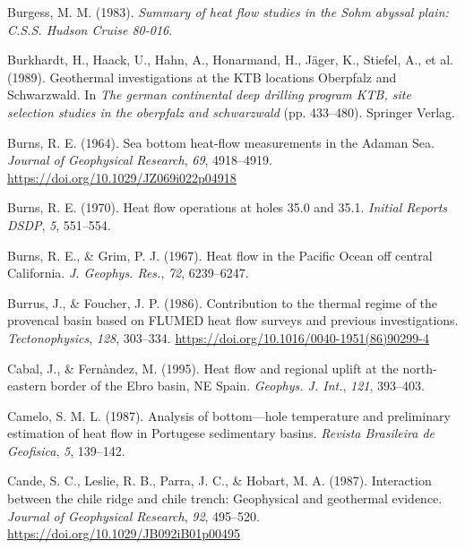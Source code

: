 \begin{CSLReferences}{1}{1}
\leavevmode{}%
Burgess, M. M. (1983). \emph{Summary of heat flow studies in the {Sohm} abyssal plain: {C.S.S. Hudson Cruise} 80-016}.

\leavevmode{}%
Burkhardt, H., Haack, U., Hahn, A., Honarmand, H., Jäger, K., Stiefel, A., et al. (1989). Geothermal investigations at the {KTB locations Oberpfalz and Schwarzwald}. In \emph{The german continental deep drilling program KTB, site selection studies in the oberpfalz and schwarzwald} (pp. 433--480). Springer Verlag.

\leavevmode{}%
Burns, R. E. (1964). Sea bottom heat-flow measurements in the {Adaman Sea}. \emph{Journal of Geophysical Research}, \emph{69}, 4918--4919. \url{https://doi.org/10.1029/JZ069i022p04918}

\leavevmode{}%
Burns, R. E. (1970). Heat flow operations at holes 35.0 and 35.1. \emph{Initial Reports DSDP}, \emph{5}, 551--554.

\leavevmode{}%
Burns, R. E., \& Grim, P. J. (1967). Heat flow in the {Pacific Ocean} off central {California}. \emph{J. Geophys. Res.}, \emph{72}, 6239--6247.

\leavevmode{}%
Burrus, J., \& Foucher, J. P. (1986). Contribution to the thermal regime of the provencal basin based on FLUMED heat flow surveys and previous investigations. \emph{Tectonophysics}, \emph{128}, 303--334. \url{https://doi.org/10.1016/0040-1951(86)90299-4}

\leavevmode{}%
Cabal, J., \& Fernàndez, M. (1995). Heat flow and regional uplift at the north-eastern border of the {Ebro basin, NE Spain}. \emph{Geophys. J. Int.}, \emph{121}, 393--403.

\leavevmode{}%
Camelo, S. M. L. (1987). Analysis of bottom---hole temperature and preliminary estimation of heat flow in {Portugese} sedimentary basins. \emph{Revista Brasileira de Geofisica}, \emph{5}, 139--142.

\leavevmode{}%
Cande, S. C., Leslie, R. B., Parra, J. C., \& Hobart, M. A. (1987). Interaction between the chile ridge and chile trench: Geophysical and geothermal evidence. \emph{Journal of Geophysical Research}, \emph{92}, 495--520. \url{https://doi.org/10.1029/JB092iB01p00495}


\end{CSLReferences}
